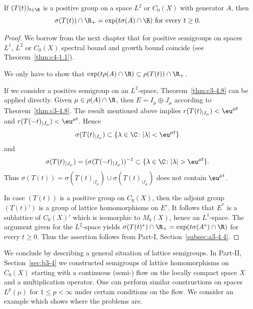 \begin{corollary}\label{cor:c3-4.10}
If\/ $(T(t))_{t \in \R }$ is a positive group on a space $L^2$ or
$C_0(X)$ with generator $A$, then
\begin{equation}\label{eq:c3-4.11}
	\sigma(T(t)) \cap \R _+ = \exp(t\sigma(A) \cap \R ) \  \text{for every} \  t \geq 0 .
\end{equation}
\end{corollary}
\begin{proof} 
We borrow from the next chapter that for positive semigroups on
spaces $L^1$, $L^2$ or $C_0(X)$ spectral bound%
and growth bound%
coincide (see Theorem~\ref{thm:c4-1.1}).

We only have to show that $\exp(t\rho(A) \cap \R ) \subset \rho(T(t)) \cap \R _+$.

If we consider a positive semigroup on an $L^2$-space, Theorem~\ref{thm:c3-4.8} can be
applied directly. Given $\mu \in \rho(A) \cap \R $, then $E = I_{\mu} \oplus J_{\mu}$ according to
Theorem~\ref{thm:c3-4.8}. 
The result mentioned above implies 
$r(T(t)_{|I_{\mu}}) < \eu^{\mu t}$ and
$r(T(-t)_{|J_{\mu}}) < \eu^{\mu t}$. 
Hence 
%
\[
	\sigma(T(t)_{|I_{\mu}}) \subset \{\lambda \in \C  \colon |\lambda| < \eu^{\mu t}\}
\]
and
\[
	\sigma(T(t)_{|J_{\mu}}) = (\sigma(T(-t)_{|J_{\mu}}))^{-1} 
		\subset \{\lambda \in \C  \colon |\lambda| > \eu^{\mu t}\}.
\]
%
Thus $\sigma(T(t)) = \sigma(T(t)_{|I_{\mu}}) \cup \sigma(T(t)_{|J_{\mu}})$ does not contain $\eu^{\mu t}$.

In case $(T(t))$ is a positive group on $C_0(X)$, then the adjoint
group $(T(t)')$ is a group of lattice homomorphisms on $E'$. It
follows that $E^*$ is a sublattice of\/ $C_0(X)'$ which is isomorphic to $M_b(X)$, hence an
$L^1$-space. 
The argument given for the $L^2$-space yields
$\sigma(T(t)^*) \cap \R _+ = \exp(t\sigma(A^*) \cap \R )$ for every $t \geq 0$. 
Thus the assertion follows from Part-I, Section~\ref{subsec:a3-4.4}.
\end{proof}

We conclude by describing a general situation of lattice semigroups. 
In Part-II, Section~\ref{sec:b3-4} we constructed semigroups of lattice
homomorphisms on $C_0(X)$ starting with a continuous (semi-) flow on the
locally compact space $X$ and a multiplication operator. 
One can perform similar constructions on spaces $L^p(\mu)$ for $1 \leq p < \infty$ under
certain conditions on the flow. 
We consider an example which shows where the problems are.

